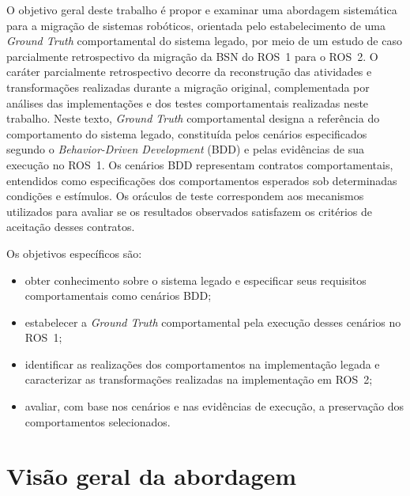 O objetivo geral deste trabalho é propor e examinar uma abordagem sistemática para a migração de sistemas robóticos, orientada pelo estabelecimento de uma \textit{Ground Truth} comportamental do sistema legado, por meio de um estudo de caso parcialmente retrospectivo da migração da BSN do ROS~1 para o ROS~2. 
O caráter parcialmente retrospectivo decorre da reconstrução das atividades e transformações realizadas durante a migração original, complementada por análises das implementações e dos testes comportamentais realizadas neste trabalho. Neste texto, \textit{Ground Truth} comportamental designa a referência do comportamento do sistema legado, constituída pelos cenários especificados segundo o \textit{Behavior-Driven Development} (BDD) e pelas evidências de sua execução no ROS~1. Os cenários BDD representam contratos comportamentais, entendidos como especificações dos comportamentos esperados sob determinadas condições e estímulos. Os oráculos de teste correspondem aos mecanismos utilizados para avaliar se os resultados observados satisfazem os critérios de aceitação desses contratos.


Os objetivos específicos são:
\begin{itemize}
    \item obter conhecimento sobre o sistema legado e especificar seus requisitos comportamentais como cenários BDD;
    \item estabelecer a \textit{Ground Truth} comportamental pela execução desses cenários no ROS~1;
    \item identificar as realizações dos comportamentos na implementação legada e caracterizar as transformações realizadas na implementação em ROS~2;
    \item avaliar, com base nos cenários e nas evidências de execução, a preservação dos comportamentos selecionados.
\end{itemize}

\section{Visão geral da abordagem}

